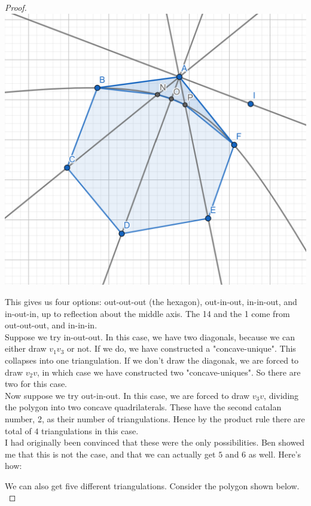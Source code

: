 \documentclass[12pt]{article}
\theoremstyle{definition}
\begin{document}
\begin{proof}
\includegraphics[scale=1]{transformation_1.png} 


This gives us four options: out-out-out (the hexagon), out-in-out, in-in-out, and in-out-in, up to reflection about the middle axis. The 14 and the 1 come from out-out-out, and in-in-in. \\


Suppose we try in-out-out. In this case, we have two diagonals, because we can either draw $v_1v_3$ or not. If we do, we have constructed a "concave-unique". This collapses into one triangulation. If we don't draw the diagonak, we are forced to draw $v_2v$, in which case we have constructed two "concave-uniques". So there are two for this case.\\


Now suppose we try out-in-out. In this case, we are forced to draw $v_3v$, dividing the polygon into two concave quadrilaterals. These have the second catalan number, 2, as their number of triangulations. Hence by the product rule there are total of $4$ triangulations in this case. \\

I had originally been convinced that these were the only possibilities. Ben showed me that this is not the case, and that we can actually get $5$ and $6$ as well. Here's how:


We can also get five different triangulations. Consider the polygon shown below. \\



\end{proof}
\end{document}
